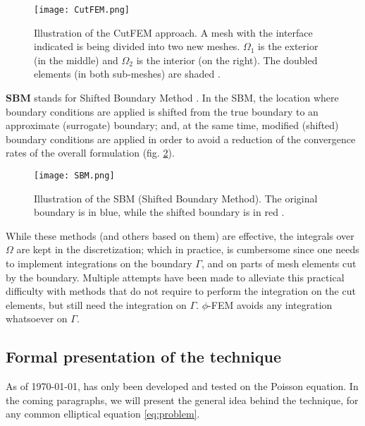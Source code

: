 \begin{figure}[H]
    \centering
    \texttt{[image: CutFEM.png]}
    \caption{Illustration of the CutFEM approach. A mesh with the interface indicated is being divided into two new meshes. $\Omega_1$ is the exterior (in the middle) and $\Omega_2$ is the interior (on the right). The doubled elements (in both sub-meshes) are shaded \parencite{burman2015cutfem}.}
    \label{fig:CutFEM}
\end{figure}


\textbf{SBM} stands for Shifted Boundary Method \parencite{main2018shifted}. In the SBM, the location where boundary conditions are applied is shifted from the true boundary to an approximate (surrogate) boundary; and, at the same time, modified (shifted) boundary conditions
are applied in order to avoid a reduction of the convergence rates of the overall formulation (fig. \ref{fig:SBM}).

\begin{figure}[H]
    \centering
    \texttt{[image: SBM.png]}
    \caption{Illustration of the SBM (Shifted Boundary Method). The original boundary is in blue, while the shifted boundary is in red \parencite{atallah2020analysis}.}
    \label{fig:SBM}
\end{figure}


While these methods (and others based on them) are effective, the integrals over $\Omega$ are kept in the discretization; which in practice, is cumbersome since one needs to implement integrations on the boundary $\Gamma$, and on parts of mesh elements cut by the boundary. Multiple attempts have been made to alleviate this practical difficulty with methods that do not require to perform the integration on the cut elements, but still need the integration on $\Gamma$. $\phi$-FEM avoids any integration whatsoever on $\Gamma$.


\subsection{Formal presentation of the \phifem technique}

As of \today, \phifem has only been developed and tested on the Poisson equation. In the coming paragraphs, we will present the general idea behind the technique, for any common elliptical equation \eqref{eq:problem}. 

